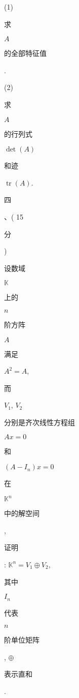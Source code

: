 \documentclass[10pt]{article}
\begin{document}
(1) \begin{CJK}{UTF8}{mj}求\end{CJK} $A$ \begin{CJK}{UTF8}{mj}的全部特征值\end{CJK}.

(2) \begin{CJK}{UTF8}{mj}求\end{CJK} $A$ \begin{CJK}{UTF8}{mj}的行列式\end{CJK} $\operatorname{det}(A)$ \begin{CJK}{UTF8}{mj}和迹\end{CJK} $\operatorname{tr}(A)$.

\begin{CJK}{UTF8}{mj}四\end{CJK}、( 15 \begin{CJK}{UTF8}{mj}分\end{CJK}) \begin{CJK}{UTF8}{mj}设数域\end{CJK} $\mathbb{K}$ \begin{CJK}{UTF8}{mj}上的\end{CJK} $n$ \begin{CJK}{UTF8}{mj}阶方阵\end{CJK} $A$ \begin{CJK}{UTF8}{mj}满足\end{CJK} $A^{2}=A$, \begin{CJK}{UTF8}{mj}而\end{CJK} $V_{1}$, $V_{2}$ \begin{CJK}{UTF8}{mj}分别是齐次线性方程组\end{CJK} $A x=0$ \begin{CJK}{UTF8}{mj}和\end{CJK} $\left(A-I_{n}\right) x=0$ \begin{CJK}{UTF8}{mj}在\end{CJK} $\mathbb{K}^{n}$ \begin{CJK}{UTF8}{mj}中的解空间\end{CJK}, \begin{CJK}{UTF8}{mj}证明\end{CJK}: $\mathbb{K}^{n}=V_{1} \oplus V_{2}$, \begin{CJK}{UTF8}{mj}其中\end{CJK} $I_{n}$ \begin{CJK}{UTF8}{mj}代表\end{CJK} $n$ \begin{CJK}{UTF8}{mj}阶单位矩阵\end{CJK}, $\oplus$ \begin{CJK}{UTF8}{mj}表示直和\end{CJK}.
\end{document}
